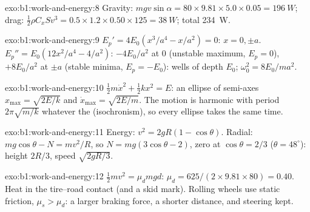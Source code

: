 \begin{solution}{exo:b1:work-and-energy:8}
Gravity: $mgv\sin\alpha = 80 \times 9.81 \times 5.0 \times 0.05 = \qty{196}{W}$;
drag: $\tfrac12\rho C_xSv^3 = 0.5 \times 1.2 \times 0.50 \times 125 =
\qty{38}{W}$; total \qty{234}{W}.
\end{solution}

\begin{solution}{exo:b1:work-and-energy:9}
$E_p' = 4E_0(x^3/a^4 - x/a^2) = 0$: $x = 0, \pm a$. $E_p'' = E_0(12x^2/a^4 -
4/a^2)$: $-4E_0/a^2$ at $0$ (unstable maximum, $E_p = 0$), $+8E_0/a^2$
at $\pm a$ (stable minima, $E_p = -E_0$): wells of depth $E_0$;
$\omega_0^2 = 8E_0/ma^2$.
\end{solution}

\begin{solution}{exo:b1:work-and-energy:10}
$\tfrac12 m\dot x^2 + \tfrac12 kx^2 = E$: an ellipse of semi-axes $x_{\max}
= \sqrt{2E/k}$ and $\dot x_{\max} = \sqrt{2E/m}$. The motion is harmonic
with period $2\pi\sqrt{m/k}$ whatever the  (isochronism), so
every ellipse takes the same time.
\end{solution}

\begin{solution}{exo:b1:work-and-energy:11}
Energy: $v^2 = 2gR(1 - \cos\theta)$. Radial: $mg\cos\theta - N = mv^2/R$,
so $N = mg(3\cos\theta - 2)$, zero at $\cos\theta = 2/3$ ($\theta =
48^\circ$): height $2R/3$, speed $\sqrt{2gR/3}$.
\end{solution}

\begin{solution}{exo:b1:work-and-energy:12}
$\tfrac12 mv^2 = \mu_dmgd$: $\mu_d = 625/(2 \times 9.81 \times 80) = 0.40$.
Heat in the tire--road contact (and a skid mark). Rolling wheels use
static friction, $\mu_s > \mu_d$: a larger braking force, a shorter
distance, and steering kept.
\end{solution}

